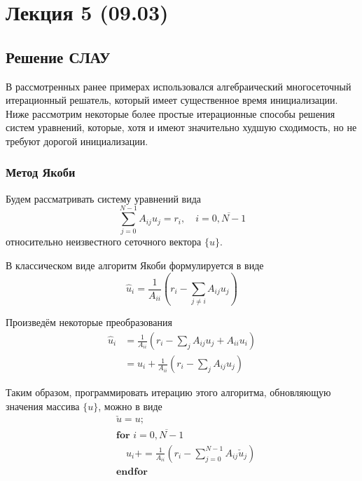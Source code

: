 \section{Лекция 5 (09.03)}
\subsection{Решение СЛАУ}

В рассмотренных ранее примерах использовался алгебраический
многосеточный итерационный решатель, который имеет существенное время
инициализации. Ниже рассмотрим некоторые более простые итерационные способы решения систем
уравнений, которые, хотя и имеют значительно худшую сходимость, но не требуют дорогой инициализации.

\subsubsection{Метод Якоби}
\label{sec:SLAE-Jacobi}

Будем рассматривать систему уравнений вида
\begin{equation*}
    \sum_{j=0}^{N-1} A_{ij} u_j = r_i, \quad i = \overline{0, N-1}
\end{equation*}
относительно неизвестного сеточного вектора $\{u\}$.

В классическом виде алгоритм Якоби формулируется в виде
\begin{equation*}
    \hat u_i = \frac{1}{A_{ii}}\left(r_i - \sum_{j\neq i} A_{ij}{u_j}\right)
\end{equation*}

Произведём некоторые преобразования
\begin{align*}
    \hat u_i &= \frac{1}{A_{ii}}\left(r_i - \sum_{j} A_{ij}{u_j} + A_{ii}u_i\right) \\
             &= u_i + \frac{1}{A_{ii}}\left(r_i - \sum_{j} A_{ij}{u_j}\right)
\end{align*}

Таким образом, программировать итерацию этого алгоритма, обновляющую значения массива $\{u\}$, можно в виде
\begin{align*}
    &\check u = u; \\
    &\textbf{for } i=\overline{0, N-1} \\ 
    &\quad u_i \mathrel{{+}{=}} \frac{1}{A_{ii}}\left(r_i - \sum_{j=0}^{N-1} A_{ij}{\check u_j}\right)\\
    &\textbf{endfor} \\
\end{align*}


